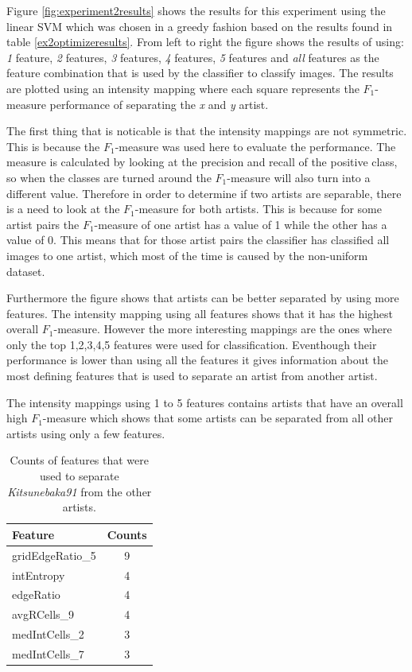 Figure \ref{fig:experiment2results} shows the results for this experiment using the linear SVM which was chosen in a greedy fashion based on the results found in table \ref{ex2optimizeresults}.
From left to right the figure shows the results of using: \textit{1} feature, \textit{2} features, \textit{3} features, \textit{4} features, \textit{5} features and \textit{all} features as the feature combination that is used by the classifier to classify images.
The results are plotted using an intensity mapping where each square represents the $F_1$-measure performance of separating the \textit{x} and \textit{y} artist.

The first thing that is noticable is that the intensity mappings are not symmetric.
This is because the $F_1$-measure was used here to evaluate the performance.
The measure is calculated by looking at the precision and recall of the positive class, so when the classes are turned around the $F_1$-measure will also turn into a different value.
Therefore in order to determine if two artists are separable, there is a need to look at the $F_1$-measure for both artists.
This is because for some artist pairs the $F_1$-measure of one artist has a value of 1 while the other has a value of 0.
This means that for those artist pairs the classifier has classified all images to one artist, which most of the time is caused by the non-uniform dataset.

Furthermore the figure shows that artists can be better separated by using more features.
The intensity mapping using all features shows that it has the highest overall $F_1$-measure.
However the more interesting mappings are the ones where only the top 1,2,3,4,5 features were used for classification.
Eventhough their performance is lower than using all the features it gives information about the most defining features that is used to separate an artist from another artist.

The intensity mappings using 1 to 5 features contains artists that have an overall high $F_1$-measure which shows that some artists can be separated from all other artists using only a few features.

\begin{table}[htb]
    \centering
    \begin{tabular}
        { | l | c |} 
        \hline
        Feature & Counts \\
        \hline
        gridEdgeRatio\_5 & 9 \\ 
        intEntropy & 4 \\ 
        edgeRatio & 4 \\ 
        avgRCells\_9 & 4 \\ 
        medIntCells\_2 & 3 \\
        medIntCells\_7 & 3 \\
        \hline 
    \end{tabular}
    \caption{Counts of features that were used to separate \textit{Kitsunebaka91} from the other artists.}
    \label{kitsune}
\end{table}


